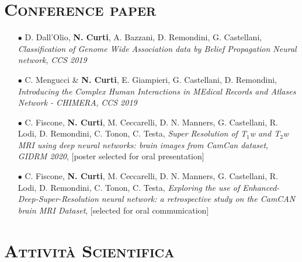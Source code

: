 \documentclass[a4paper,11pt]{article}
\begin{document}
\vspace*{0.5cm}
\section*{\scshape{Conference paper}}

\begin{itemize}

  \item[$\bullet$] D. Dall'Olio, \textbf{N. Curti}, A. Bazzani, D. Remondini, G. Castellani, \emph{Classification of Genome Wide Association data by Belief Propagation Neural network}, \emph{CCS 2019}

  \item[$\bullet$] C. Mengucci \& \textbf{N. Curti}, E. Giampieri, G. Castellani, D. Remondini, \emph{Introducing the Complex Human Interactions in MEdical Records and Atlases Network - CHIMERA}, \emph{CCS 2019}

  \item[$\bullet$] C. Fiscone, \textbf{N. Curti}, M. Ceccarelli, D. N. Manners, G. Castellani, R. Lodi, D. Remondini, C. Tonon, C. Testa, \emph{Super Resolution of T$_1$w and T$_2$w MRI using deep neural networks: brain images from CamCan dataset}, \emph{GIDRM 2020}, [poster selected for oral presentation]

  \item[$\bullet$] C. Fiscone, \textbf{N. Curti}, M. Ceccarelli, D. N. Manners, G. Castellani, R. Lodi, D. Remondini, C. Tonon, C. Testa, \emph{Exploring the use of Enhanced-Deep-Super-Resolution neural network: a retrospective study on the CamCAN brain MRI Dataset}, [selected for oral communication]

\end{itemize}




\vspace*{0.5cm}
\section*{\scshape{Attività Scientifica}}
\end{document}
